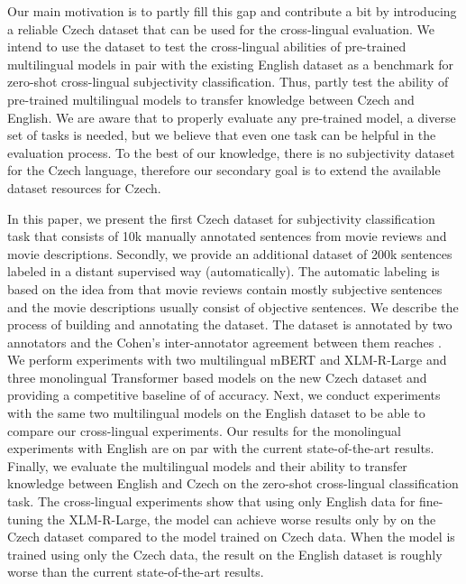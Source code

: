 \documentclass[10pt, a4paper]{article}
\begin{document}
\par Our main motivation is to partly fill this gap and contribute a bit by introducing a reliable Czech dataset that can be used for the cross-lingual evaluation. We intend to use the dataset to test the cross-lingual abilities of pre-trained multilingual models in pair with the existing English dataset \cite{english-dataset} as a benchmark for zero-shot cross-lingual subjectivity classification. Thus, partly test the ability of pre-trained multilingual models to transfer knowledge between Czech and English. We are aware that to properly evaluate any pre-trained model, a diverse set of tasks is needed, but we believe that even one task can be helpful in the evaluation process. To the best of our knowledge, there is no subjectivity dataset for the Czech language, therefore our secondary goal is to extend the available dataset resources for Czech.

In this paper, we present the first Czech dataset for subjectivity classification task that consists of 10k manually annotated sentences from movie reviews and movie descriptions. Secondly, we provide an additional dataset of 200k sentences labeled in a distant supervised way (automatically). The automatic labeling is based on the idea from \cite{english-dataset} that movie reviews contain mostly subjective sentences and the movie descriptions usually consist of objective sentences. We describe the process of building and annotating the dataset. The dataset is annotated by two annotators and the Cohen’s  \cite{cohen1960coefficient} inter-annotator agreement between them reaches . We perform experiments with two multilingual mBERT \cite{devlin-etal-2019-bert} and XLM-R-Large \cite{xlm-r} and three monolingual Transformer based models on the new Czech dataset and providing a competitive baseline of  of accuracy. Next, we conduct experiments with the same two multilingual models on the English dataset to be able to compare our cross-lingual experiments. Our results for the monolingual experiments with English are on par with the current state-of-the-art results. Finally, we evaluate the multilingual models and their ability to transfer knowledge between English and Czech on the zero-shot cross-lingual classification task. The cross-lingual experiments show that using only English data for fine-tuning the XLM-R-Large, the model can achieve worse results only by  on the Czech dataset compared to the model trained on Czech data. When the model is trained using only the Czech data, the result on the English dataset is roughly  worse than the current state-of-the-art results.
\end{document}
